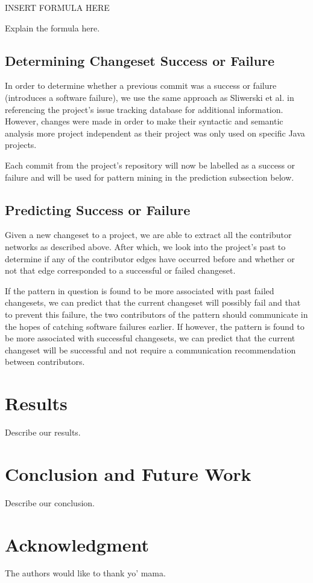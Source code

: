 \documentclass[conference]{IEEEtran}
\begin{document}
INSERT FORMULA HERE

Explain the formula here.

\subsection{Determining Changeset Success or Failure}
In order to determine whether a previous commit was a success or failure (introduces a software
failure), we use the same approach as Sliwerski et al. \cite{Sliwerski:2005:CIF} in referencing the project's issue tracking
database for additional information. However, changes were made in order to make their syntactic 
and semantic analysis more project independent as their project was only used on specific Java projects. 

Each commit from the project's repository will now be labelled as a success
or failure and will be used for pattern mining in the prediction subsection below.

\subsection{Predicting Success or Failure}
Given a new changeset to a project, we are able to extract all the contributor networks as described
above. After which, we look into the project's past to determine if any of the contributor edges have
occurred before and whether or not that edge corresponded to a successful or failed changeset.

If the pattern in question is found to be more associated with past failed changesets, we can predict that
the current changeset will possibly fail and that to prevent this failure, the two contributors of the 
pattern should communicate in the hopes of catching software failures earlier. If however, the pattern
is found to be more associated with successful changesets, we can predict that the current changeset
will be successful and not require a communication recommendation between contributors.


\section{Results}
Describe our results.


\section{Conclusion and Future Work}
Describe our conclusion.


\section*{Acknowledgment}
The authors would like to thank yo' mama.






\end{document}
